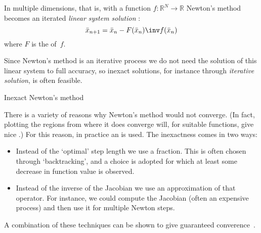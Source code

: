 In multiple dimensions, that is, with a function
$f\colon\mathbb{R}^N\rightarrow\mathbb{R}$
Newton's method becomes an iterated
\emph{linear system solution}%
:
\[ \bar x_{n+1} = \bar x_n-F(\bar x_n)\inv f(\bar x_n) \]
where $F$ is the  of~$f$.

Since Newton's method is an iterative process we do not need the
solution of this linear system to full accuracy, so inexact solutions,
for instance through
\emph{iterative solution},
is often feasible.

 {Inexact Newton's method}

There is a variety of reasons why Newton's method would not converge.
(In fact, plotting the regions from where it does converge will, for
suitable functions, give nice .)
For this reason, in practice an
 is used. The inexactness comes
in two ways:
\begin{itemize}
\item Instead of the `optimal' step length we use a fraction. This is
  often chosen through `backtracking', and a choice is adopted for
  which at least some decrease in function value is observed.
\item Instead of the inverse of the Jacobian we use an approximation
  of that operator. For instance, we could compute the Jacobian (often
  an expensive process) and then use it for multiple Newton steps.
\end{itemize}
A combination of these techniques can be shown to give guaranteed
converence~\cite{zhwa94}.
